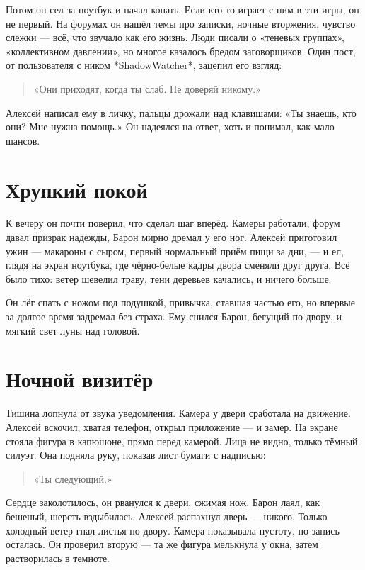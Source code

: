 \documentclass[12pt,a4paper]{book}
\begin{document}
Потом он сел за ноутбук и начал копать. Если кто-то играет с ним в эти игры, он не первый. На форумах он нашёл темы про записки, ночные вторжения, чувство слежки — всё, что звучало как его жизнь. Люди писали о «теневых группах», «коллективном давлении», но многое казалось бредом заговорщиков. Один пост, от пользователя с ником *ShadowWatcher*, зацепил его взгляд:

\begin{quote}
«Они приходят, когда ты слаб. Не доверяй никому.»
\end{quote}

Алексей написал ему в личку, пальцы дрожали над клавишами: «Ты знаешь, кто они? Мне нужна помощь.» Он надеялся на ответ, хоть и понимал, как мало шансов.

\section{Хрупкий покой}

К вечеру он почти поверил, что сделал шаг вперёд. Камеры работали, форум давал призрак надежды, Барон мирно дремал у его ног. Алексей приготовил ужин — макароны с сыром, первый нормальный приём пищи за дни, — и ел, глядя на экран ноутбука, где чёрно-белые кадры двора сменяли друг друга. Всё было тихо: ветер шевелил траву, тени деревьев качались, и ничего больше.

Он лёг спать с ножом под подушкой, привычка, ставшая частью его, но впервые за долгое время задремал без страха. Ему снился Барон, бегущий по двору, и мягкий свет луны над головой.

\section{Ночной визитёр}

Тишина лопнула от звука уведомления. Камера у двери сработала на движение. Алексей вскочил, хватая телефон, открыл приложение — и замер. На экране стояла фигура в капюшоне, прямо перед камерой. Лица не видно, только тёмный силуэт. Она подняла руку, показав лист бумаги с надписью:

\begin{quote}
«Ты следующий.»
\end{quote}

Сердце заколотилось, он рванулся к двери, сжимая нож. Барон лаял, как бешеный, шерсть вздыбилась. Алексей распахнул дверь — никого. Только холодный ветер гнал листья по двору. Камера показывала пустоту, но запись осталась. Он проверил вторую — та же фигура мелькнула у окна, затем растворилась в темноте.
\end{document}
